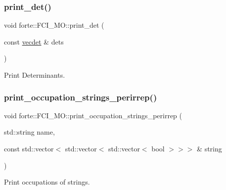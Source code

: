 \subsubsection{\texorpdfstring{print\+\_\+det()}{print\_det()}}
{\footnotesize\ttfamily void forte\+::\+F\+C\+I\+\_\+\+M\+O\+::print\+\_\+det (\begin{DoxyParamCaption}\item[{const \mbox{\hyperlink{fci__mo_8h_a777ccac2de1a8940d2f654e59ff12f06}{vecdet}} \&}]{dets }\end{DoxyParamCaption})\hspace{0.3cm}{\ttfamily [protected]}}



Print Determinants. 

\mbox{\label{classforte_1_1_f_c_i___m_o_a6fc1a5cee8e71a31926e609488241221}} 
\subsubsection{\texorpdfstring{print\+\_\+occupation\+\_\+strings\+\_\+perirrep()}{print\_occupation\_strings\_perirrep()}}
{\footnotesize\ttfamily void forte\+::\+F\+C\+I\+\_\+\+M\+O\+::print\+\_\+occupation\+\_\+strings\+\_\+perirrep (\begin{DoxyParamCaption}\item[{std\+::string}]{name,  }\item[{const std\+::vector$<$ std\+::vector$<$ std\+::vector$<$ bool $>$$>$$>$ \&}]{string }\end{DoxyParamCaption})\hspace{0.3cm}{\ttfamily [protected]}}



Print occupations of strings. 

\mbox{\label{classforte_1_1_f_c_i___m_o_a1f2bcf2ea19611c93bb6a99eeaab5e51}} 
